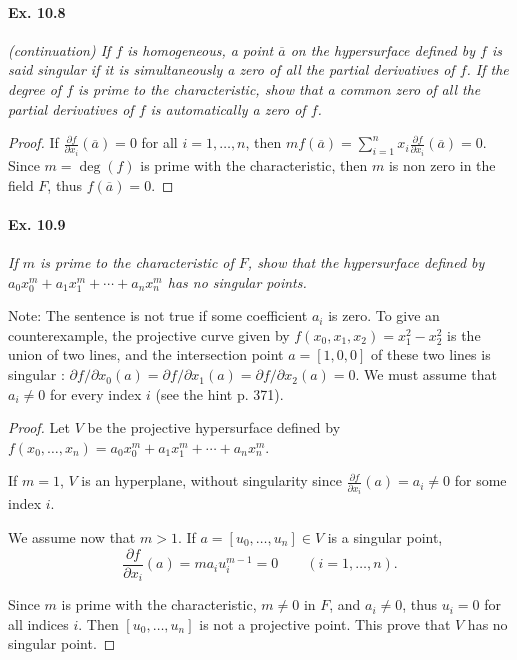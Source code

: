 \documentclass[11pt,a4paper]{article}
\begin{document}
\paragraph{Ex. 10.8} {\it (continuation) If $f$ is homogeneous, a point $\overline{a}$ on the hypersurface defined by $f$ is said singular if it is simultaneously a zero of all the partial derivatives of $f$. If the degree of $f$ is prime to the characteristic, show that a common zero of all the partial derivatives of $f$ is automatically a zero of $f$.
}
\begin{proof}
If $\frac{\partial f}{\partial x_i} (\overline{a}) = 0$ for all $i = 1,\ldots,n$, then $mf(\overline{a}) = \sum\limits_{i=1}^n x_i \frac{\partial f}{\partial x_i} (\overline{a}) = 0$. Since $m = \deg(f)$ is prime with the characteristic, then $m$ is non zero in the field $F$, thus $f(\overline{a}) = 0$.
\end{proof}

\paragraph{Ex. 10.9} {\it If $m$ is prime to the characteristic of $F$, show that the hypersurface defined by $a_0x_0^m+a_1x_1^m+ \cdots + a_n x_n^m$ has no singular points.
}

\medskip

Note: The sentence is not true if some coefficient $a_i$ is zero. To give an counterexample, the projective curve given by $f(x_0,x_1,x_2) = x_1^2 -x_2^2$ is the union of two lines, and the intersection point $a =[1,0,0]$ of these two lines is singular : $\partial f/ \partial x_0(a) = \partial f/ \partial x_1(a) = \partial f/ \partial x_2(a) = 0$. We must assume that $a_i \ne 0$ for every index $i$ (see the hint p. 371).


\begin{proof} Let $V$ be the projective hypersurface defined by $f(x_0,\ldots,x_n) = a_0x_0^m+a_1x_1^m+ \cdots + a_n x_n^m$. 

If $m=1$, $V$ is an hyperplane, without singularity since $\frac{\partial f}{\partial x_i} (a) = a_i \ne 0$ for some index $i$.

We assume now that $m>1$. If $a = [u_0,\dots,u_n] \in V$ is a singular point, $$\frac{\partial f}{\partial x_i}(a) = ma_i u_i^{m-1} = 0\qquad (i=1,\ldots,n).$$ 

Since $m$ is prime with the characteristic, $m \ne 0$ in $F$, and $a_i \ne 0$, thus $u_i = 0$ for all indices $i$. Then $[u_0,\ldots,u_n]$ is not a projective point. This prove that $V$ has no singular point.
\end{proof}
\end{document}

